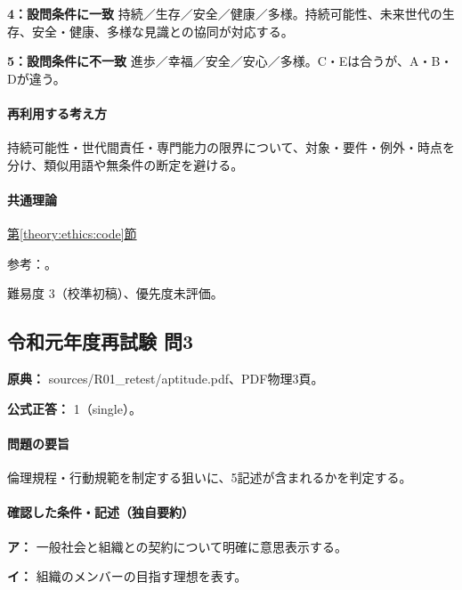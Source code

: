 \noindent\textbf{4：設問条件に一致} 持続／生存／安全／健康／多様。持続可能性、未来世代の生存、安全・健康、多様な見識との協同が対応する。\par

\noindent\textbf{5：設問条件に不一致} 進歩／幸福／安全／安心／多様。C・Eは合うが、A・B・Dが違う。\par

\paragraph{再利用する考え方} 持続可能性・世代間責任・専門能力の限界について、対象・要件・例外・時点を分け、類似用語や無条件の断定を避ける。

\paragraph{共通理論} \hyperref[theory:ethics:code]{第\ref*{theory:ethics:code}節}

\par 参考：\cite{ieej_conduct2007}。

\par 難易度 3（校準初稿）、優先度未評価。

\subsection{令和元年度再試験 問3}
\label{q:r01-ret-apt-03}

\noindent\textbf{原典：} sources/R01\_retest/aptitude.pdf、PDF物理3頁。

\textbf{公式正答：} 1（single）。

\paragraph{問題の要旨} 倫理規程・行動規範を制定する狙いに、5記述が含まれるかを判定する。

\paragraph{確認した条件・記述（独自要約）}\mbox{}\par

\noindent\textbf{ア：} 一般社会と組織との契約について明確に意思表示する。\par

\noindent\textbf{イ：} 組織のメンバーの目指す理想を表す。\par


